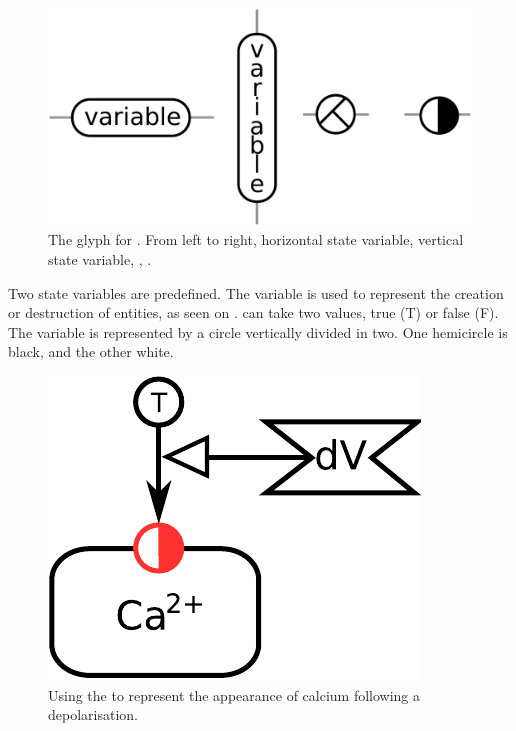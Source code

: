 \begin{figure}[H]
  \centering
  \includegraphics[scale = 0.3]{images/stateVariable}
  \caption{The \ER glyph for . From left to right, horizontal state variable, vertical state variable, , .}
  \label{fig:state-var}
\end{figure}

Two state variables are predefined. The variable  is used to represent the creation or destruction of entities, as seen on \label{sec:existence}.  can take two values, true (T) or false (F). The variable is represented by a circle vertically divided in two. One hemicircle is black, and the other white. 

\begin{figure}[H]
  \centering
  \includegraphics[scale = 0.5]{examples/ex-existence}
  \caption{Using the   to represent the appearance of calcium following a depolarisation.}
  \label{fig:ex-existence}
\end{figure}

